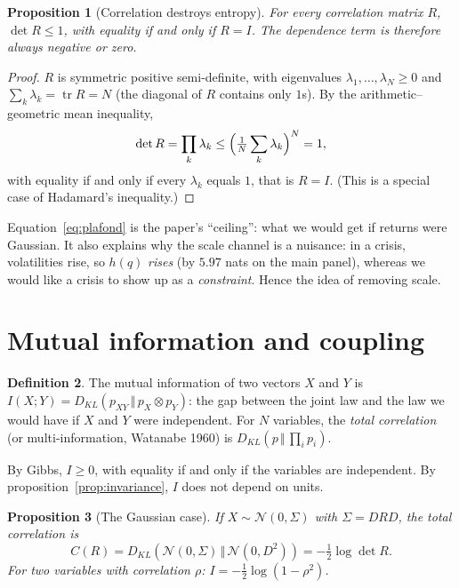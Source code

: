 \documentclass[11pt]{article}
\theoremstyle{plain}
\newtheorem{proposition}{Proposition}[section]
\theoremstyle{definition}
\newtheorem{definition}[proposition]{Definition}
\theoremstyle{remark}
\newcommand{\N}{\mathcal{N}}
\newcommand{\tr}{\operatorname{tr}}
\newcommand{\KL}[2]{D_{KL}\!\left(#1\,\Vert\,#2\right)}
\begin{document}
\begin{proposition}[Correlation destroys entropy]
\label{prop:hadamard}
For every correlation matrix $R$, $\det R\le1$, with equality if and only if
$R=I$. The dependence term is therefore always negative or zero.
\end{proposition}

\begin{proof}
$R$ is symmetric positive semi-definite, with eigenvalues
$\lambda_1,\dots,\lambda_N\ge0$ and $\sum_k\lambda_k=\tr R=N$ (the diagonal of
$R$ contains only $1$s). By the arithmetic--geometric mean inequality,
\[
\det R=\prod_k\lambda_k\le\Bigl(\tfrac1N\sum_k\lambda_k\Bigr)^N=1,
\]
with equality if and only if every $\lambda_k$ equals $1$, that is $R=I$.
(This is a special case of Hadamard's inequality.)
\end{proof}

\begin{papier}
Equation~\eqref{eq:plafond} is the paper's ``ceiling'': what we would get if
returns were Gaussian. It also explains why the scale channel is a nuisance:
in a crisis, volatilities rise, so $h(q)$ \emph{rises} (by $5.97$ nats on the
main panel), whereas we would like a crisis to show up as a
\emph{constraint}. Hence the idea of removing scale.
\end{papier}

\section{Mutual information and coupling}
\label{sec:couplage}

\begin{definition}
The mutual information of two vectors $X$ and $Y$ is
$I(X;Y)=\KL{p_{XY}}{p_X\otimes p_Y}$: the gap between the joint law and the
law we would have if $X$ and $Y$ were independent. For $N$ variables, the
\emph{total correlation} (or multi-information, Watanabe 1960) is
$\KL{p}{\prod_ip_i}$.
\end{definition}

By Gibbs, $I\ge0$, with equality if and only if the variables are
independent. By proposition~\ref{prop:invariance}, $I$ does not depend on
units.

\begin{proposition}[The Gaussian case]
\label{prop:migauss}
If $X\sim\N(0,\Sigma)$ with $\Sigma=DRD$, the total correlation is
\[
C(R)=\KL{\N(0,\Sigma)}{\N(0,D^2)}=-\tfrac12\log\det R .
\]
For two variables with correlation $\rho$: $I=-\tfrac12\log(1-\rho^2)$.
\end{proposition}
\end{document}
